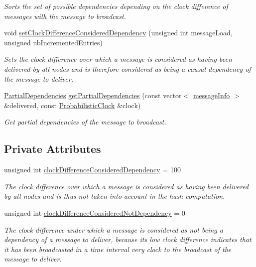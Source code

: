 \begin{DoxyCompactItemize}
\begin{DoxyCompactList}\small\item\em Sorts the set of possible dependencies depending on the clock difference of messages with the message to broadcast. \end{DoxyCompactList}\item 
void \hyperlink{class_error_detector_clock_difference_a529b87b6eaee9041601af1ca36b51c93}{set\+Clock\+Difference\+Considered\+Dependency} (unsigned int message\+Load, unsigned nb\+Incremented\+Entries)
\begin{DoxyCompactList}\small\item\em Sets the clock difference over which a message is considered as having been delivered by all nodes and is therefore considered as being a causal dependency of the message to deliver. \end{DoxyCompactList}\item 
\hyperlink{class_partial_dependencies}{Partial\+Dependencies} \hyperlink{class_error_detector_clock_difference_a26f4c2905859947201d0a18146f2e961}{get\+Partial\+Dependencies} (const vector$<$ \hyperlink{structures_8h_a7e7bdc1d2fff8a9436f2f352b2711ed6}{message\+Info} $>$ \&delivered, const \hyperlink{class_probabilistic_clock}{Probabilistic\+Clock} \&clock)
\begin{DoxyCompactList}\small\item\em Get partial dependencies of the message to broadcast. \end{DoxyCompactList}\end{DoxyCompactItemize}
\subsection*{Private Attributes}
\begin{DoxyCompactItemize}
\item 
unsigned int \hyperlink{class_error_detector_clock_difference_a0d2a3c4111e8bb4b3c232aacca9a0062}{clock\+Difference\+Considered\+Dependency} = 100
\begin{DoxyCompactList}\small\item\em The clock difference over which a message is considered as having been delivered by all nodes and is thus not taken into account in the hash computation. \end{DoxyCompactList}\item 
unsigned int \hyperlink{class_error_detector_clock_difference_aa733fc7d2023d62a7418ca20e01e9f5a}{clock\+Difference\+Considered\+Not\+Dependency} = 0
\begin{DoxyCompactList}\small\item\em The clock difference under which a message is considered as not being a dependency of a message to deliver, because its low clock difference indicates that it has been broadcasted in a time interval very clock to the broadcast of the message to deliver. \end{DoxyCompactList}\end{DoxyCompactItemize}


